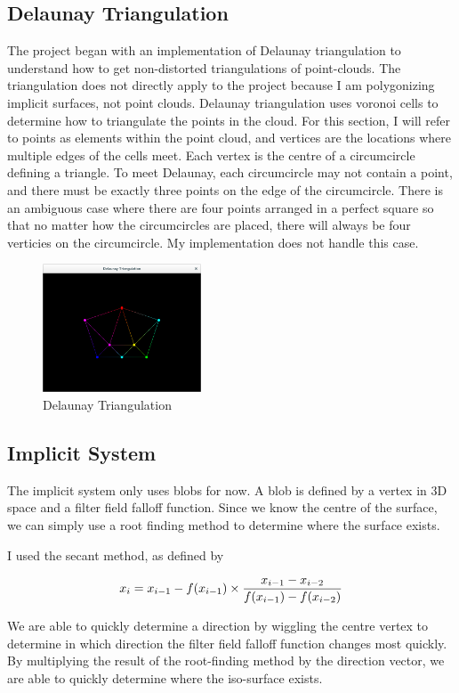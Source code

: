 \documentclass[conference]{acmsiggraph}
\begin{document}
\subsection{Delaunay Triangulation}
The project began with an implementation of Delaunay triangulation to
understand how to get non-distorted triangulations of point-clouds. The
triangulation does not directly apply to the project because I am polygonizing
implicit surfaces, not point clouds. Delaunay triangulation uses voronoi cells
to determine how to triangulate the points in the cloud. For this section, I
will refer to points as elements within the point cloud, and vertices are the
locations where multiple edges of the cells meet. Each vertex is the centre of
a circumcircle defining a triangle. To meet Delaunay, each circumcircle may not
contain a point, and there must be exactly three points on the edge of the
circumcircle. There is an ambiguous case where there are four points arranged
in a perfect square so that no matter how the circumcircles are placed, there
will always be four verticies on the circumcircle. My implementation does not
handle this case.
\begin{figure}
	\centering
	\includegraphics[height=1.5in]{images/Triangulated.png}
	\caption{Delaunay Triangulation}
\end{figure}


\subsection{Implicit System}

The implicit system only uses blobs for now. A blob is defined by a vertex in
3D space and a filter field falloff function. Since we know the centre of the
surface, we can simply use a root finding method to determine where the surface
exists.

I used the secant method, as defined by

$$x_i = x_{i-1} - f(x_{i-1}) \times {{x_{i-1} - x_{i-2}}\over{f(x_{i-1}) -
f(x_{i-2})}}$$

We are able to quickly determine a direction by wiggling
the centre vertex to determine in which direction the filter field falloff
function changes most quickly. By multiplying the result of the root-finding
method by the direction vector, we are able to quickly determine where the
iso-surface exists.
\end{document}
